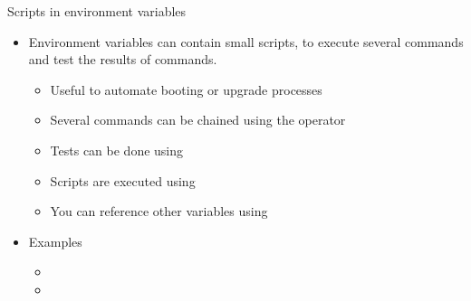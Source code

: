 \begin{frame}{Scripts in environment variables}
  \begin{itemize}
  \item Environment variables can contain small scripts, to execute
    several commands and test the results of commands.
    \begin{itemize}
    \item Useful to automate booting or upgrade processes
    \item Several commands can be chained using the \code{;} operator
    \item Tests can be done using
    \item Scripts are executed using 
    \item You can reference other variables using
    \end{itemize}
  \item Examples
    \begin{itemize}
    \item {}
    \item {}
  \end{itemize}
\end{itemize}
\end{frame}

